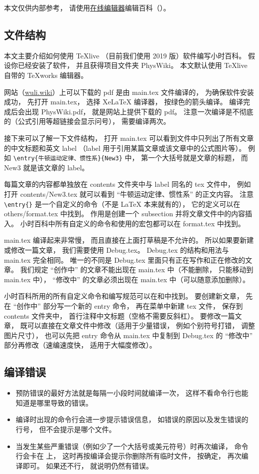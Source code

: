 
本文仅供内部参考， 请使用\href{https://wuli.wiki/editor}{在线编辑器}编辑百科（）。

\subsection{文件结构}

本文主要介绍如何使用 TeXlive （目前我们使用 2019 版）软件编写小时百科。 假设你已经安装了软件， 并且获得项目文件夹 PhysWiki。 本文默认使用 TeXlive 自带的 TeXworks 编辑器。

网站（\href{https://wuli.wiki}{wuli.wiki}）上可以下载的 pdf 是由 main.tex 文件编译的， 为确保软件安装成功， 先打开 main.tex， 选择 XeLaTeX 编译器， 按绿色的箭头编译。 编译完成后会出现 PhysWiki.pdf， 就是网站上提供下载的 pdf。 注意一次编译是不彻底的（公式引用等超链接会显示问号）， 需要编译两次。

接下来可以了解一下文件结构， 打开 main.tex 可以看到文件中只列出了所有文章的中文标题和英文 label （label 用于引用某篇文章或该文章中的公式图片等）。 例如 \verb`\entry{牛顿运动定律、惯性系}{New3}` 中， 第一个大括号就是文章的标题， 而 New3 就是该文章的 label。

每篇文章的内容都单独放在 contents 文件夹中与 label 同名的 tex 文件中， 例如打开 contents/New3.tex 就可以看到 “牛顿运动定律、惯性系” 的正文内容。 注意 \verb`\entry{}` 是一个自定义的命令（不是 LaTeX 本来就有的）， 它的定义可以在 others/format.tex 中找到。 作用是创建一个 subsection 并将文章文件中的内容插入。 小时百科中所有自定义的命令和使用的宏包都可以在 format.tex 中找到。

main.tex 编译起来非常慢， 而且直接在上面打草稿是不允许的。 所以如果要新建或修改一篇文章， 我们需要使用 Debug.tex。 Debug.tex 的结构和用法与 main.tex 完全相同。 唯一的不同是 Debug.tex 里面只有正在写作和正在修改的文章。 我们规定 “创作中” 的文章不能出现在 main.tex 中（不能删除， 只能移动到 main.tex 中）， “修改中” 的文章必须出现在 main.tex 中（可以随意添加删除）。

小时百科所用的所有自定义命令和编写规范可以在和中找到。 要创建新文章， 先在 “创作中” 部分写一个新的 entry 命令， 再在菜单中新建 tex 文件， 保存到 contents 文件夹中， 首行注释中文标题（空格不需要反斜杠）。 要修改一篇文章， 既可以直接在文章文件中修改（适用于少量错误， 例如个别符号打错， 调整图片尺寸）， 也可以先把 entry 命令从 main.tex 中复制到 Debug.tex 的 “修改中” 部分再修改（速编速度快， 适用于大幅度修改）。

\subsection{编译错误}

\begin{itemize}
\item 预防错误的最好方法就是每隔一小段时间就编译一次， 这样不看命令行也能知道是哪里导致的错误。
\item 编译时出现的命令行会进一步提示错误信息， 如错误的原因以及发生错误的行号， 但不会提示是哪个文件。
\item 当发生某些严重错误（例如少了一个大括号或美元符号）时再次编译， 命令行会卡在 \verb`` 上， 这时再按编译会提示你删除所有临时文件， 按确定， 再次编译即可。 如果还不行， 就说明仍然有错误。
\end{itemize}
